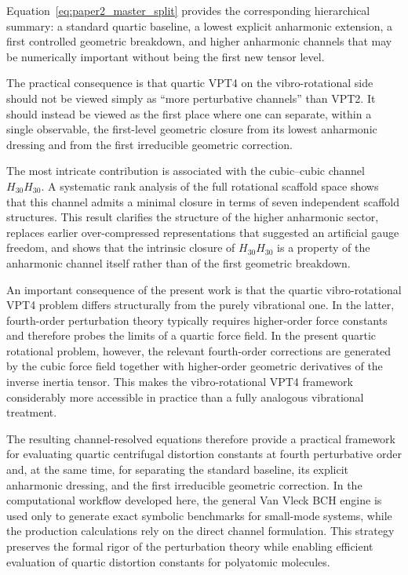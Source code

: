 \documentclass[aip,jcp,reprint]{revtex4-2}
\begin{document}
Equation~\eqref{eq:paper2_master_split} provides the corresponding
hierarchical summary: a standard quartic baseline, a lowest explicit
anharmonic extension, a first controlled geometric breakdown, and higher
anharmonic channels that may be numerically important without being the first
new tensor level.

The practical consequence is that quartic VPT4 on the vibro-rotational side
should not be viewed simply as ``more perturbative channels'' than VPT2.  It
should instead be viewed as the first place where one can separate, within a
single observable, the first-level geometric closure from its lowest
anharmonic dressing and from the first irreducible geometric correction.

The most intricate contribution is associated with the cubic--cubic
channel $H_{30}H_{30}$. A systematic rank analysis of the full rotational
scaffold space shows that this channel admits a minimal closure in terms
of seven independent scaffold structures. This result clarifies the
structure of the higher anharmonic sector, replaces earlier
over-compressed representations that suggested an artificial gauge
freedom, and shows that the intrinsic closure of $H_{30}H_{30}$ is a
property of the anharmonic channel itself rather than of the first
geometric breakdown.

An important consequence of the present work is that the quartic
vibro-rotational VPT4 problem differs structurally from the purely
vibrational one. In the latter, fourth-order perturbation theory
typically requires higher-order force constants and therefore probes the
limits of a quartic force field. In the present quartic rotational
problem, however, the relevant fourth-order corrections are generated by
the cubic force field together with higher-order geometric derivatives of
the inverse inertia tensor. This makes the vibro-rotational VPT4
framework considerably more accessible in practice than a fully
analogous vibrational treatment.

The resulting channel-resolved equations therefore provide a practical
framework for evaluating quartic centrifugal distortion constants at
fourth perturbative order and, at the same time, for separating the
standard baseline, its explicit anharmonic dressing, and the first
irreducible geometric correction. In the computational workflow developed here,
the general Van Vleck BCH engine is used only to generate exact symbolic
benchmarks for small-mode systems, while the production calculations rely
on the direct channel formulation. This strategy preserves the formal
rigor of the perturbation theory while enabling efficient evaluation of
quartic distortion constants for polyatomic molecules.
\end{document}
